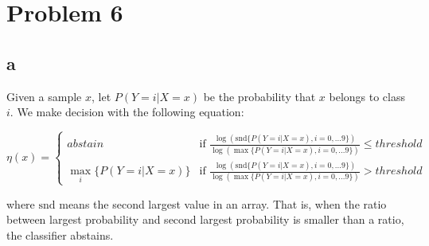 \documentclass[a4paper,11pt]{article}
\theoremstyle{mytheor}
\begin{document}
\begin{table}[h]
\caption{Probability of wrongly classified samples belonging to each class.}
\label{tab:prob}
\end{table}

\section*{Problem 6}
\subsection*{a}
Given a sample $x$, let
$P(Y = i | X = x)$ be the probability that $x$ belongs to class $i$. We make decision with the following equation:

\begin{equation}
\eta(x) = \left\{ \begin{array}{ll}
abstain & \mbox{if $\frac{\log(\text{snd} \{P(Y=i | X = x ), i = 0,...9 \} )}{\log(\max \{P(Y=i | X = x ), i = 0,...9 \})}  $} \leq threshold \\
\max_i \{P(Y=i | X = x )\} & \mbox{if $\frac{\log(\text{snd} \{P(Y=i | X = x ), i = 0,...9 \}) }{\log(\max \{P(Y=i | X = x ), i = 0,...9 \})} $} > threshold \end{array} 
\right.
\end{equation}

where $\text{snd}$ means the second largest value in an array. That is, when the ratio between largest probability and second largest probability is smaller than a ratio, the classifier abstains.
\end{document}
